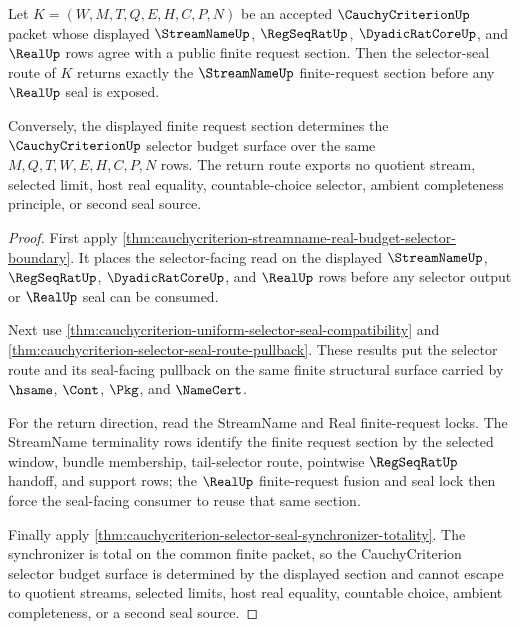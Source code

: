 \begin{theorem}
\label{thm:cauchycriterion-finite-request-section-return}
Let $K=(W,M,T,Q,E,H,C,P,N)$ be an accepted $\CauchyCriterionUp$ packet whose
displayed $\StreamNameUp$, $\RegSeqRatUp$, $\DyadicRatCoreUp$, and $\RealUp$
rows agree with a public finite request section. Then the selector-seal route
of $K$ returns exactly the $\StreamNameUp$ finite-request section before any
$\RealUp$ seal is exposed.

Conversely, the displayed finite request section determines the
$\CauchyCriterionUp$ selector budget surface over the same $M,Q,T,W,E,H,C,P,N$
rows. The return route exports no quotient stream, selected limit, host real
equality, countable-choice selector, ambient completeness principle, or second
seal source.
\end{theorem}
\begin{proof}
First apply
\autoref{thm:cauchycriterion-streamname-real-budget-selector-boundary}. It
places the selector-facing read on the displayed
$\StreamNameUp$, $\RegSeqRatUp$, $\DyadicRatCoreUp$, and $\RealUp$ rows before
any selector output or $\RealUp$ seal can be consumed.

Next use
\autoref{thm:cauchycriterion-uniform-selector-seal-compatibility} and
\autoref{thm:cauchycriterion-selector-seal-route-pullback}. These results put
the selector route and its seal-facing pullback on the same finite structural
surface carried by $\hsame$, $\Cont$, $\Pkg$, and $\NameCert$.

For the return direction, read the StreamName and Real finite-request locks.
The StreamName terminality rows identify the finite request section by the
selected window, bundle membership, tail-selector route, pointwise
$\RegSeqRatUp$ handoff, and support rows; the $\RealUp$ finite-request fusion
and seal lock then force the seal-facing consumer to reuse that same section.

Finally apply
\autoref{thm:cauchycriterion-selector-seal-synchronizer-totality}. The
synchronizer is total on the common finite packet, so the CauchyCriterion
selector budget surface is determined by the displayed section and cannot
escape to quotient streams, selected limits, host real equality, countable
choice, ambient completeness, or a second seal source.
\end{proof}

